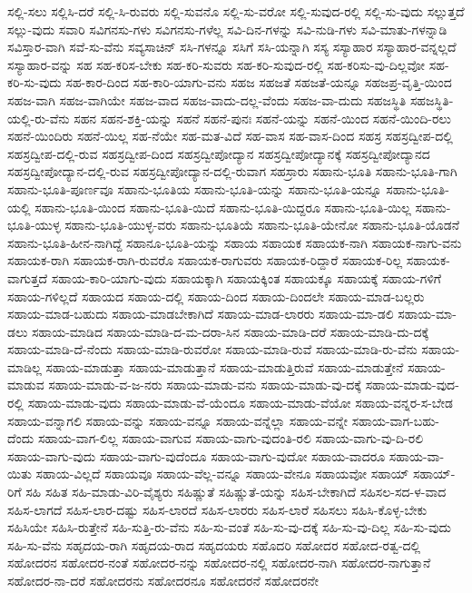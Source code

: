 {ಸಲ್ಲಿ-ಸಲು
ಸಲ್ಲಿಸಿ-ದರೆ
ಸಲ್ಲಿ-ಸಿ-ರುವರು
ಸಲ್ಲಿ-ಸುವನೊ
ಸಲ್ಲಿ-ಸು-ವರೋ
ಸಲ್ಲಿ-ಸುವುದ-ರಲ್ಲಿ
ಸಲ್ಲಿ-ಸು-ವುದು
ಸಲ್ಲುತ್ತದೆ
ಸಲ್ಲು-ವುದು
ಸವಾರಿ
ಸವಿಗನಸು-ಗಳು
ಸವಿಗನಸು-ಗಳೆಲ್ಲ
ಸವಿ-ದಿನ-ಗಳನ್ನು
ಸವಿ-ನುಡಿ-ಗಳು
ಸವಿ-ಮಾತು-ಗಳನ್ನಾಡಿ
ಸವಿಸ್ತಾರ-ವಾಗಿ
ಸವೆ-ಸು-ವೆನು
ಸವ್ಯಸಾಚಿನ್
ಸಸಿ-ಗಳನ್ನೂ
ಸಸಿಗೆ
ಸಸಿ-ಯನ್ನಾಗಿ
ಸಸ್ಯ
ಸಸ್ಯಾಹಾರ
ಸಸ್ಯಾಹಾರ-ವನ್ನಲ್ಲದೆ
ಸಸ್ಯಾಹಾರ-ವನ್ನು
ಸಹ
ಸಹ-ಕರಿಸ-ಬೇಕು
ಸಹ-ಕರಿ-ಸುವರು
ಸಹ-ಕರಿ-ಸುವುದ-ರಲ್ಲಿ
ಸಹ-ಕರಿಸು-ವು-ದಿಲ್ಲವೋ
ಸಹ-ಕರಿ-ಸು-ವುದು
ಸಹ-ಕಾರ-ದಿಂದ
ಸಹ-ಕಾರಿ-ಯಾಗು-ವನು
ಸಹಜ
ಸಹಜತೆ
ಸಹಜತೆ-ಯನ್ನೂ
ಸಹಜಪ್ರ-ವೃತ್ತಿ-ಯಿಂದ
ಸಹಜ-ವಾಗಿ
ಸಹಜ-ವಾಗಿಯೇ
ಸಹಜ-ವಾದ
ಸಹಜ-ವಾದು-ದಲ್ಲ-ವೆಂದು
ಸಹಜ-ವಾ-ದುದು
ಸಹಜಸ್ಥಿತಿ
ಸಹಜಸ್ಥಿತಿ-ಯಲ್ಲಿ-ರು-ವೆನು
ಸಹನ
ಸಹನ-ಶಕ್ತಿ-ಯನ್ನು
ಸಹನೆ
ಸಹನೆ-ಪುನಃ
ಸಹನೆ-ಯನ್ನು
ಸಹನೆ-ಯಿಂದ
ಸಹನೆ-ಯಿಂದಿ-ರಲು
ಸಹನೆ-ಯಿಂದಿರು
ಸಹನೆ-ಯಿಲ್ಲ
ಸಹ-ನೆಯೇ
ಸಹ-ಮತ-ವಿದೆ
ಸಹ-ವಾಸ
ಸಹ-ವಾಸ-ದಿಂದ
ಸಹಸ್ರ
ಸಹಸ್ರದ್ವೀಪ-ದಲ್ಲಿ
ಸಹಸ್ರದ್ವೀಪ-ದಲ್ಲಿ-ರುವ
ಸಹಸ್ರದ್ವೀಪ-ದಿಂದ
ಸಹಸ್ರದ್ವೀಪೋದ್ಯಾನ
ಸಹಸ್ರದ್ವೀಪೋದ್ಯಾನಕ್ಕೆ
ಸಹಸ್ರದ್ವೀಪೋದ್ಯಾನದ
ಸಹಸ್ರದ್ವೀಪೋದ್ಯಾನ-ದಲ್ಲಿ-ರುವ
ಸಹಸ್ರದ್ವೀಪೋದ್ಯಾನ-ದಲ್ಲಿ-ರುವಾಗ
ಸಹಸ್ರಾರು
ಸಹಾನು-ಭೂತಿ
ಸಹಾನು-ಭೂತಿ-ಗಾಗಿ
ಸಹಾನು-ಭೂತಿ-ಪೂರ್ಣವೂ
ಸಹಾನು-ಭೂತಿಯ
ಸಹಾನು-ಭೂತಿ-ಯನ್ನು
ಸಹಾನು-ಭೂತಿ-ಯನ್ನೂ
ಸಹಾನು-ಭೂತಿ-ಯಲ್ಲಿ
ಸಹಾನು-ಭೂತಿ-ಯಿಂದ
ಸಹಾನು-ಭೂತಿ-ಯಿದೆ
ಸಹಾನು-ಭೂತಿ-ಯಿದ್ದರೂ
ಸಹಾನು-ಭೂತಿ-ಯಿಲ್ಲ
ಸಹಾನು-ಭೂತಿ-ಯುಳ್ಳ
ಸಹಾನು-ಭೂತಿ-ಯುಳ್ಳ-ವರು
ಸಹಾನು-ಭೂತಿಯೆ
ಸಹಾನು-ಭೂತಿ-ಯೇನೋ
ಸಹಾನು-ಭೂತಿ-ಯೊಡನೆ
ಸಹಾನು-ಭೂತಿ-ಹೀನ-ನಾಗಿದ್ದೆ
ಸಹಾನೂ-ಭೂತಿ-ಯನ್ನು
ಸಹಾಯ
ಸಹಾಯಕ
ಸಹಾಯಕ-ನಾಗಿ
ಸಹಾಯಕ-ನಾಗು-ವನು
ಸಹಾಯಕ-ರಾಗಿ
ಸಹಾಯಕ-ರಾಗಿ-ರುವರೊ
ಸಹಾಯಕ-ರಾಗುವರು
ಸಹಾಯಕ-ರಿದ್ದಾರೆ
ಸಹಾಯಕ-ರಿಲ್ಲ
ಸಹಾಯಕ-ವಾಗುತ್ತದೆ
ಸಹಾಯ-ಕಾರಿ-ಯಾಗು-ವುದು
ಸಹಾಯಕ್ಕಾಗಿ
ಸಹಾಯಕ್ಕಿಂತ
ಸಹಾಯಕ್ಕೂ
ಸಹಾಯಕ್ಕೆ
ಸಹಾಯ-ಗಳಿಗೆ
ಸಹಾಯ-ಗಳಿಲ್ಲದೆ
ಸಹಾಯದ
ಸಹಾಯ-ದಲ್ಲಿ
ಸಹಾಯ-ದಿಂದ
ಸಹಾಯ-ದಿಂದಲೇ
ಸಹಾಯ-ಮಾಡ-ಬಲ್ಲರು
ಸಹಾಯ-ಮಾಡ-ಬಹುದು
ಸಹಾಯ-ಮಾಡಬೇಕಾಗಿದೆ
ಸಹಾಯ-ಮಾಡ-ಲಾರರು
ಸಹಾಯ-ಮಾ-ಡಲಿ
ಸಹಾಯ-ಮಾ-ಡಲು
ಸಹಾಯ-ಮಾಡಿದ
ಸಹಾಯ-ಮಾಡಿ-ದ-ಮ-ದರಾ-ಸಿನ
ಸಹಾಯ-ಮಾಡಿ-ದರೆ
ಸಹಾಯ-ಮಾಡಿ-ದು-ದಕ್ಕೆ
ಸಹಾಯ-ಮಾಡಿ-ದೆ-ನೆಂದು
ಸಹಾಯ-ಮಾಡಿ-ರುವರೋ
ಸಹಾಯ-ಮಾಡಿ-ರುವೆ
ಸಹಾಯ-ಮಾಡಿ-ರು-ವೆನು
ಸಹಾಯ-ಮಾಡಿಲ್ಲ
ಸಹಾಯ-ಮಾಡುತ್ತಾ
ಸಹಾಯ-ಮಾಡುತ್ತಾನೆ
ಸಹಾಯ-ಮಾಡುತ್ತಿರುವೆ
ಸಹಾಯ-ಮಾಡುತ್ತೇನೆ
ಸಹಾಯ-ಮಾಡುವ
ಸಹಾಯ-ಮಾಡು-ವ-ಜ-ನರು
ಸಹಾಯ-ಮಾಡು-ವನು
ಸಹಾಯ-ಮಾಡು-ವು-ದಕ್ಕೆ
ಸಹಾಯ-ಮಾಡು-ವುದ-ರಲ್ಲಿ
ಸಹಾಯ-ಮಾಡು-ವುದು
ಸಹಾಯ-ಮಾಡು-ವೆ-ಯೆಂದೂ
ಸಹಾಯ-ಮಾಡು-ವೆಯೋ
ಸಹಾಯ-ವನ್ನರ-ಸ-ಬೇಡ
ಸಹಾಯ-ವನ್ನಾಗಲಿ
ಸಹಾಯ-ವನ್ನು
ಸಹಾಯ-ವನ್ನೂ
ಸಹಾಯ-ವನ್ನೆಲ್ಲಾ
ಸಹಾಯ-ವನ್ನೇ
ಸಹಾಯ-ವಾಗ-ಬಹು-ದೆಂದು
ಸಹಾಯ-ವಾಗ-ಲಿಲ್ಲ
ಸಹಾಯ-ವಾಗುವ
ಸಹಾಯ-ವಾಗು-ವುದಂತಿ-ರಲಿ
ಸಹಾಯ-ವಾಗು-ವು-ದಿ-ರಲಿ
ಸಹಾಯ-ವಾಗು-ವುದು
ಸಹಾಯ-ವಾಗು-ವುದೆಂದೂ
ಸಹಾಯ-ವಾಗು-ವುದೋ
ಸಹಾಯ-ವಾದರೂ
ಸಹಾಯ-ವಾ-ಯಿತು
ಸಹಾಯ-ವಿಲ್ಲದೆ
ಸಹಾಯವೂ
ಸಹಾಯ-ವೆಲ್ಲ-ವನ್ನೂ
ಸಹಾಯ-ವೇನೂ
ಸಹಾಯವೋ
ಸಹಾಯ್
ಸಹಾಯ್-ರಿಗೆ
ಸಹಿ
ಸಹಿತ
ಸಹಿ-ಮಾಡು-ವಿರಿ-ವೈಶ್ಯರು
ಸಹಿಷ್ಣುತೆ
ಸಹಿಷ್ಣುತೆ-ಯನ್ನು
ಸಹಿಸ-ಬೇಕಾಗಿದೆ
ಸಹಿಸಲ-ಸದ-ಳ-ವಾದ
ಸಹಿಸ-ಲಾಗದೆ
ಸಹಿಸ-ಲಾರ-ದಷ್ಟು
ಸಹಿಸ-ಲಾರದೆ
ಸಹಿಸ-ಲಾರರು
ಸಹಿಸ-ಲಾರೆ
ಸಹಿಸಲು
ಸಹಿಸಿ-ಕೊಳ್ಳ-ಬೇಕು
ಸಹಿಸಿಯೇ
ಸಹಿಸಿ-ರುತ್ತೇನೆ
ಸಹಿ-ಸುತ್ತಿ-ರು-ವೆನು
ಸಹಿ-ಸು-ವಂತೆ
ಸಹಿ-ಸು-ವು-ದಕ್ಕೆ
ಸಹಿ-ಸು-ವು-ದಿಲ್ಲ
ಸಹಿ-ಸು-ವುದು
ಸಹಿ-ಸು-ವೆನು
ಸಹೃದಯ-ರಾಗಿ
ಸಹೃದಯ-ರಾದ
ಸಹೃದಯರು
ಸಹೊದರಿ
ಸಹೋದರ
ಸಹೋದ-ರತ್ವ-ದಲ್ಲಿ
ಸಹೋದರನ
ಸಹೋದರ-ನಂತೆ
ಸಹೋದರ-ನನ್ನು
ಸಹೋದರ-ನಲ್ಲಿ
ಸಹೋದರ-ನಾಗಿ
ಸಹೋದರ-ನಾಗುತ್ತಾನೆ
ಸಹೋದರ-ನಾ-ದರೆ
ಸಹೋದರನು
ಸಹೋದರನೂ
ಸಹೋದರನೆ
ಸಹೋದರನೇ
}
